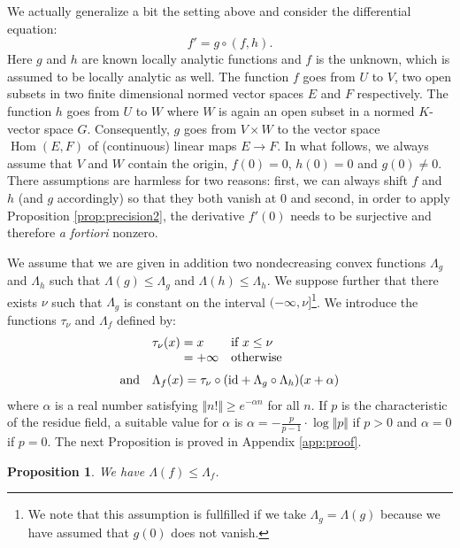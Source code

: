 \documentclass{sig-alternate}
\DeclareMathOperator{\Hom}{Hom}
\newtheorem{prop}[theo]{Proposition}
\newcommand{\id}{\textrm{id}}
\begin{document}
We actually generalize a bit the setting above and consider the 
differential equation:
\begin{equation}
\label{eq:diffequah}
f' = g \circ (f, h).
\end{equation}
Here $g$ and $h$ are known locally analytic functions and $f$ is the 
unknown, which is assumed to be locally analytic as well. The function
$f$ goes from $U$ to $V$, two open subsets in two finite dimensional
normed vector spaces $E$ 
and $F$ respectively. The function $h$ goes from $U$ to $W$ where $W$
is again an open subset in a normed $K$-vector space $G$. Consequently,
$g$ goes from $V \times W$ to the vector space $\Hom(E,F)$ of
(continuous) linear maps $E \to F$.
In what follows, we always assume that $V$ and $W$ contain the origin, 
$f(0) = 0$, $h(0) = 0$ and $g(0) \neq 0$. There assumptions are harmless 
for two reasons: first, we can always shift $f$ and $h$ (and $g$ 
accordingly) so that they both vanish at $0$ and second, in order to 
apply Proposition \ref{prop:precision2}, the derivative $f'(0)$ 
needs to be surjective and therefore \emph{a fortiori} nonzero.

We assume that we are given in addition two nondecreasing convex 
functions $\Lambda_g$ and $\Lambda_h$ such that $\Lambda(g) \leq 
\Lambda_g$ and $\Lambda(h) \leq \Lambda_h$. We suppose further that 
there exists $\nu$ such that $\Lambda_g$ is constant on the interval 
$({-}\infty, \nu]$\footnote{We note that this assumption is fullfilled if 
we take $\Lambda_g = \Lambda(g)$ because we have assumed that $g(0)$ 
does not vanish.}. We introduce the functions $\tau_\nu$ and $\Lambda_f$ 
defined by:
$$\begin{array}{rll}
&\tau_\nu(x) = x & \text{if } x \leq \nu \\
& \hphantom{\tau_\nu(x)} = {+} \infty & \text{otherwise} \medskip \\
\text{and} &
\multicolumn{2}{l}{\Lambda_f(x) = 
  \tau_\nu \circ (\id + \Lambda_g \circ \Lambda_h)(x + \alpha)}
\end{array}$$
where $\alpha$ is a real number satisfying $\Vert n! \Vert \geq 
e^{-\alpha n}$ for all $n$. If $p$ is the characteristic of the residue field,
a suitable value for $\alpha$ is $\alpha = - 
\frac p {p-1} \cdot \log \Vert p \Vert$ if $p > 0$ and $\alpha = 0$ if $p = 0$.
The next Proposition is proved in Appendix \ref{app:proof}.

\begin{prop}
\label{prop:boundLambdaf} \label{PROP:BOUNDLAMBDAF}
We have $\Lambda(f) \leq \Lambda_f$.
\end{prop}
\end{document}
